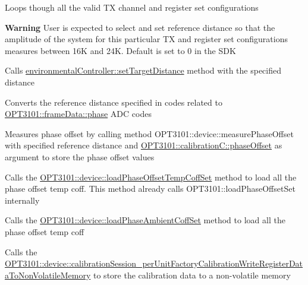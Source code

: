 \begin{DoxyItemize}
\item Loops though all the valid TX channel and register set configurations
\item {\bfseries Warning} User is expected to select and set reference distance so that the amplitude of the system for this particular TX and register set configurations measures between 16K and 24K. Default is set to 0 in the S\+DK
\item Calls \mbox{\hyperlink{classenvironmental_controller_a8251b7f25c6a6c5583c718bac664d05b}{environmental\+Controller\+::set\+Target\+Distance}} method with the specified distance
\item Converts the reference distance specified in codes related to \mbox{\hyperlink{class_o_p_t3101_1_1frame_data_af8661d11405953dc378ad4d7cb0f2db6}{O\+P\+T3101\+::frame\+Data\+::phase}} A\+DC codes
\item Measures phase offset by calling method O\+P\+T3101\+::device\+::measure\+Phase\+Offset with specified reference distance and \mbox{\hyperlink{class_o_p_t3101_1_1calibration_c_a06f6a097057b9ed8f4914f4027d709c1}{O\+P\+T3101\+::calibration\+C\+::phase\+Offset}} as argument to store the phase offset values
\item Calls the \mbox{\hyperlink{class_o_p_t3101_1_1device_a69d7fbb471d186845242774d7f2c86a8}{O\+P\+T3101\+::device\+::load\+Phase\+Offset\+Temp\+Coff\+Set}} method to load all the phase offset temp coff. This method already calls O\+P\+T3101\+::load\+Phase\+Offset\+Set internally
\item Calls the \mbox{\hyperlink{class_o_p_t3101_1_1device_ac70129fa0dacd700b19349087f000f76}{O\+P\+T3101\+::device\+::load\+Phase\+Ambient\+Coff\+Set}} method to load all the phase offset temp coff
\item Calls the \mbox{\hyperlink{class_o_p_t3101_1_1device_aa0a1b1f37d9aea753d7910de3e8c2799}{O\+P\+T3101\+::device\+::calibration\+Session\+\_\+per\+Unit\+Factory\+Calibration\+Write\+Register\+Data\+To\+Non\+Volatile\+Memory}} to store the calibration data to a non-\/volatile memory 
\end{DoxyItemize}\mbox{\label{class_o_p_t3101_1_1device_aa0a1b1f37d9aea753d7910de3e8c2799}} 
